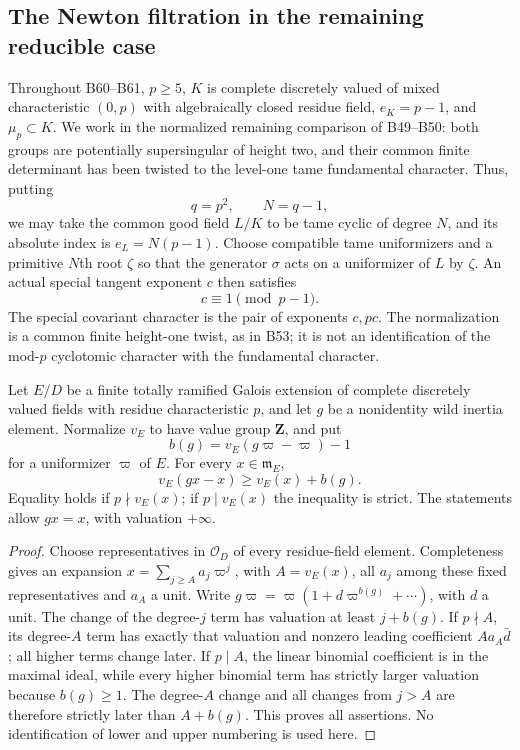 \subsection{The Newton filtration in the remaining reducible case}

Throughout B60--B61, $p\ge5$, $K$ is complete discretely valued of
mixed characteristic $(0,p)$ with algebraically closed residue field,
$e_K=p-1$, and $\mu_p\subset K$. We work in the normalized remaining
comparison of B49--B50: both groups are potentially supersingular of
height two, and their common finite determinant has been twisted to
the level-one tame fundamental character. Thus, putting
\[
              q=p^2,\qquad N=q-1,
\]
we may take the common good field $L/K$ to be tame cyclic of degree
$N$, and its absolute index is $e_L=N(p-1)$. Choose compatible tame
uniformizers and a primitive $N$th root $\zeta$ so that the generator
$\sigma$ acts on a uniformizer of $L$ by $\zeta$. An actual special
tangent exponent $c$ then satisfies
\[
                    c\equiv1\pmod{p-1}.                \tag{B-RD60.1}
\]
The special covariant character is the pair of exponents $c,pc$.
The normalization is a common finite height-one twist, as in B53;
it is not an identification of the mod-$p$ cyclotomic character
with the fundamental character.

\begin{lemma}
\label{lem:B-RD60-break}
Let $E/D$ be a finite totally ramified Galois extension of complete
discretely valued fields with residue characteristic $p$, and let
$g$ be a nonidentity wild inertia element. Normalize $v_E$ to have
value group $\mathbf Z$, and put
\[
       b(g)=v_E(g\varpi-\varpi)-1
\]
for a uniformizer $\varpi$ of $E$. For every $x\in\mathfrak m_E$,
\[
 v_E(gx-x)\ge v_E(x)+b(g).                              \tag{B-RD60.2}
\]
Equality holds if $p\nmid v_E(x)$; if $p\mid v_E(x)$ the inequality
is strict. The statements allow $gx=x$, with valuation $+\infty$.
\end{lemma}
\begin{proof}
Choose representatives in $\mathcal O_D$ of every residue-field
element. Completeness gives an expansion
$x=\sum_{j\ge A}a_j\varpi^j$, with $A=v_E(x)$, all $a_j$ among
these fixed representatives and $a_A$ a unit. Write
$g\varpi=\varpi(1+d\varpi^{b(g)}+\cdots)$, with $d$ a unit.
The change of the degree-$j$ term has valuation at least $j+b(g)$.
If $p\nmid A$, its degree-$A$ term has exactly that valuation and
nonzero leading coefficient $Aa_A\bar d$; all higher terms change
later. If $p\mid A$, the linear binomial coefficient is in the
maximal ideal, while every higher binomial term has strictly larger
valuation because $b(g)\ge1$. The degree-$A$ change and all changes
from $j>A$ are therefore strictly later than $A+b(g)$. This proves
all assertions. No identification of lower and upper numbering is
used here.
\end{proof}

